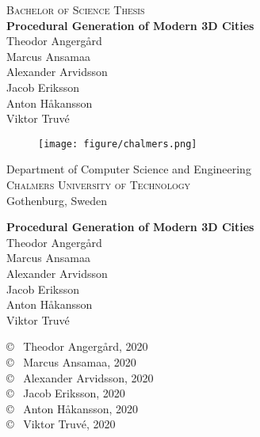 \newpage
\thispagestyle{empty}
\begin{center}
  \textsc{\large Bachelor of Science Thesis \the\year}\\[4cm]		%
  \textbf{\Large Procedural Generation of Modern 3D Cities} \\[1cm]
  {\Large
    Theodor Angergård \\[0.1cm]
    Marcus Ansamaa \\[0.1cm]
    Alexander Arvidsson \\[0.1cm]
    Jacob Eriksson \\[0.1cm]
    Anton Håkansson \\[0.1cm]
    Viktor Truvé \\[0.1cm]
  }    
  \vfill	

  \begin{figure}[H]
    \centering
    \texttt{[image: figure/chalmers.png]} \\	
  \end{figure}	\vspace{5mm}	
  
  Department of Computer Science and Engineering \\
  \textsc{Chalmers University of Technology} \\
  Gothenburg, Sweden \the\year \\
\end{center}


\newpage
\thispagestyle{empty}
\vspace*{4.5cm}
\textbf{Procedural Generation of Modern 3D Cities} \\
Theodor Angergård \\
Marcus Ansamaa \\
Alexander Arvidsson \\
Jacob Eriksson \\
Anton Håkansson \\
Viktor Truvé \\
\setlength{\parskip}{1cm}

\copyright ~ Theodor Angergård, 2020 \\
\copyright ~ Marcus Ansamaa, 2020 \\
\copyright ~ Alexander Arvidsson, 2020 \\
\copyright ~ Jacob Eriksson, 2020 \\
\copyright ~ Anton Håkansson, 2020 \\
\copyright ~ Viktor Truvé, 2020 \\

